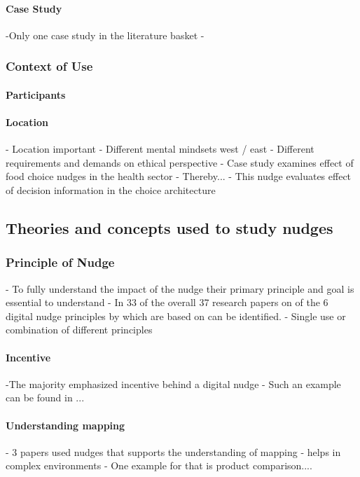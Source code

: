 \paragraph{Case Study}  %
-Only one case study in the literature basket
- 
\subsubsection{Context of Use}
\paragraph{Participants} %
\paragraph{Location} %
- Location important
- Different mental mindsets west / east
- Different requirements and demands on ethical perspective
- Case study \cite{guthrie_nudging_2015} examines effect of food choice nudges in the health sector
- Thereby...
- This nudge evaluates effect of decision information in the choice architecture


\subsection{Theories and concepts used to study nudges}

\subsubsection{Principle of Nudge} %
- To fully understand the impact of the nudge their primary principle and goal is essential to understand
- In 33 of the overall 37 research papers on of the 6 digital nudge principles by \cite{weinmann_digital_2016} which are based on \cite{thaler_nudge:_2009} can be identified.
- Single use or combination of different principles
\paragraph{Incentive}
-The majority emphasized incentive behind a digital nudge
- Such an example can be found in ... 
\paragraph{Understanding mapping}
- 3 papers used nudges that supports the understanding of mapping
- helps in complex environments
- One example for that is product comparison.... 
